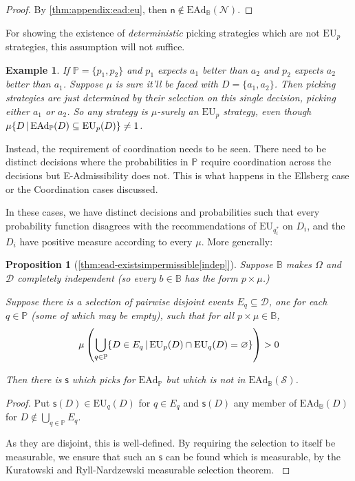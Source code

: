 \documentclass[a4paper]{article}
\newtheorem{proposition}[theorem]{Proposition}
\newtheorem{example}{Example}
\renewcommand\P{\mathbb{P}} %
\newcommand\EU{\mathrm{EU}}
\newcommand\EAd{\mathrm{EAd}}
\newcommand{\Decs}{\mathcal{D}}
\renewcommand\S{\mathcal{S}}
\newcommand\s{\mathsf{s}}
\newcommand{\n}{\mathsf{n}}
\renewcommand{\nu}{\n}
\newcommand\Nu{\mathcal{N}}
\newcommand{\IB}{\mathbb{B}}
\newcommand{\IP}{\P}
\renewcommand{\color}[1]{}
\newenvironment{colored}[1]{\leavevmode\color{#1}}{}
\newcommand\SetDelimiter[1][]{
	\nonscript\,#1\vert \allowbreak \nonscript\,\mathopen{}}
\providecommand\given{\SetDelimiter}
\renewcommand{\emptyset}{\varnothing}
\newenvironment{CCM rewritten}
{\begingroup\color{blue}} %
{\endgroup}              %
\begin{document}
\begin{colored}{violet}
\begin{proof}
	 By \cref{thm:appendix:ead:eu}, then $\nu\notin\EAd_\IB(\Nu)$. 
\end{proof}

For showing the existence of \emph{deterministic} picking strategies which are not $\EU_p$ strategies, this assumption will not suffice. 
\begin{example}
	If $\IP=\{p_1,p_2\}$ and $p_1$ expects $a_1$ better than $a_2$ and $p_2$ expects $a_2$ better than $a_1$. Suppose $\mu$ is sure it'll be faced with $D=\{a_1,a_2\}$. Then picking strategies are just determined by their selection on this single decision, picking either $a_1$ or $a_2$. So any strategy is $\mu$-surely an $\EU_p$ strategy, even though $\mu\{D\given \EAd_\IP(D)\subseteq\EU_p(D)\}\neq 1$. 
\end{example}

Instead, the requirement of coordination needs to be seen. There need to be distinct decisions where the probabilities in $\IP$  require coordination across the decisions but E-Admissibility does not. This is what happens in the Ellsberg case or the Coordination cases discussed. 

In these cases, we have distinct decisions and probabilities such that every probability function disagrees with the recommendations of $\EU_{q^*_i}$ on $D_i$, and the $D_i$ have positive measure according to every $\mu$. More generally:
\begin{proposition}[\cref{thm:ead-existsimpermissible[indep]}]

Suppose $\IB$ makes $\Omega$ and $\Decs$ completely independent (so every $b\in\IB$ has the form $p\times\mu$.)

Suppose there is a selection of pairwise disjoint events $E_q\subseteq\Decs$, one for each $q\in\IP$ (some of which may be empty), such that for all $p\times\mu\in\IB$, 
\[
\mu\left(\bigcup_{q\in\IP}\{D\in E_q\given \EU_p(D)\cap\EU_q(D)=\emptyset\}\right)>0
\]

Then there is $\s$ which picks for $\EAd_\IP$ but which is not in $\EAd_\IB(\S)$. 
\end{proposition}
\begin{proof}
	Put $\s(D)\in \EU_q(D)$ for $q\in E_q$ and $\s(D)$ any member of $\EAd_\IB(D)$ for $D\notin \bigcup_{q\in\IP}E_q$. 
	
	As they are disjoint, this is well-defined. \begin{colored}
		{blue}
		By requiring the selection to itself be measurable, we ensure that such an $\s$ can be found which is measurable, by the Kuratowski and Ryll-Nardzewski measurable selection theorem.
	\end{colored}
	

\end{proof}
\end{colored}
\end{document}
